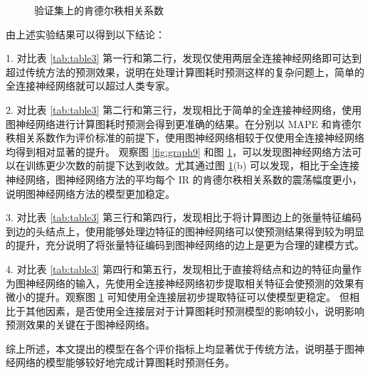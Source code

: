 \begin{figure}[htp]\scriptsize
    \begin{center}
    \caption{验证集上的肯德尔秩相关系数}
    \label{fig:graph10}
    \end{center}
\end{figure}

由上述实验结果可以得到以下结论：

1. 对比表 \ref{tab:table3} 第一行和第二行，发现仅使用两层全连接神经网络即可达到超过传统方法的预测效果，说明在处理计算图耗时预测这样的复杂问题上，简单的全连接神经网络就可以超过人类专家。

2. 对比表 \ref{tab:table3} 第二行和第三行，发现相比于简单的全连接神经网络，使用图神经网络进行计算图耗时预测会得到更准确的结果。在分别以 MAPE 和肯德尔秩相关系数作为评价标准的前提下，使用图神经网络相较于仅使用全连接神经网络均得到相对显著的提升。
观察图 \ref{fig:graph9} 和图 \ref{fig:graph10}，可以发现图神经网络方法可以在训练更少次数的前提下达到收敛。尤其通过图 \ref{fig:graph10}(b) 可以发现，相比于全连接神经网络，图神经网络方法的平均每个 IR 的肯德尔秩相关系数的震荡幅度更小，说明图神经网络方法的模型更加稳定。

3. 对比表 \ref{tab:table3} 第三行和第四行，发现相比于将计算图边上的张量特征编码到边的头结点上，使用能够处理边特征的图神经网络可以使预测结果得到较为明显的提升，充分说明了将张量特征编码到图神经网络的边上是更为合理的建模方式。

4. 对比表 \ref{tab:table3} 第四行和第五行，发现相比于直接将结点和边的特征向量作为图神经网络的输入，先使用全连接神经网络初步提取相关特征会使预测的效果有微小的提升。观察图 \ref{fig:graph10} 可知使用全连接层初步提取特征可以使模型更稳定。
但相比于其他因素，是否使用全连接层对于计算图耗时预测模型的影响较小，说明影响预测效果的关键在于图神经网络。

综上所述，本文提出的模型在各个评价指标上均显著优于传统方法，说明基于图神经网络的模型能够较好地完成计算图耗时预测任务。